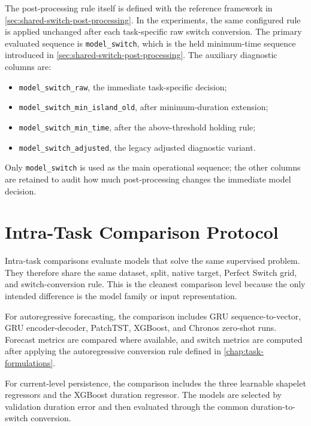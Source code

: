 The post-processing rule itself is defined with the reference framework in
\cref{sec:shared-switch-post-processing}. In the experiments, the same
configured rule is applied unchanged after each task-specific raw switch
conversion. The primary evaluated sequence is \texttt{model\_switch}, which is
the held minimum-time sequence introduced in
\cref{sec:shared-switch-post-processing}. The auxiliary diagnostic columns are:

\begin{itemize}
  \item \texttt{model\_switch\_raw}, the immediate task-specific decision;
  \item \texttt{model\_switch\_min\_island\_old}, after minimum-duration
        extension;
  \item \texttt{model\_switch\_min\_time}, after the above-threshold holding
        rule;
  \item \texttt{model\_switch\_adjusted}, the legacy adjusted diagnostic
        variant.
\end{itemize}

Only \texttt{model\_switch} is used as the main operational sequence; the other
columns are retained to audit how much post-processing changes the immediate
model decision.

\section{Intra-Task Comparison Protocol}
\label{sec:intra-task-comparison-protocol}

Intra-task comparisons evaluate models that solve the same supervised problem.
They therefore share the same dataset, split, native target, Perfect Switch
grid, and switch-conversion rule. This is the cleanest comparison level because
the only intended difference is the model family or input representation.

For autoregressive forecasting, the comparison includes GRU
sequence-to-vector, GRU encoder-decoder, PatchTST, XGBoost, and Chronos
zero-shot runs. Forecast metrics are compared where available, and switch
metrics are computed after applying the autoregressive conversion rule defined
in \cref{chap:task-formulations}.

For current-level persistence, the comparison includes the three learnable
shapelet regressors and the XGBoost duration regressor. The models are selected
by validation duration error and then evaluated through the common
duration-to-switch conversion.

